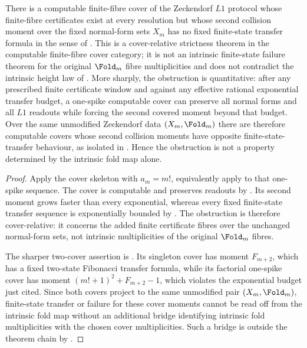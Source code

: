 \begin{theorem}
\label{thm:finite-state-strictness}
\label{thm:cover-relative-finite-fibre-certificates-do-not-force-finite-state-transfer}
There is a computable finite-fibre cover of the Zeckendorf \(L1\) protocol whose
finite-fibre certificates exist at every resolution but whose second collision
moment over the fixed normal-form sets \(X_m\) has no fixed finite-state transfer
formula in the sense of .  This is a
cover-relative strictness theorem in the computable
finite-fibre cover category; it is not an intrinsic finite-state failure theorem
for the original \(\Fold_m\) fibre multiplicities and does not contradict the
intrinsic height law of .  More sharply,
the obstruction is quantitative: after any prescribed finite certificate window
and against any effective rational exponential transfer budget, a one-spike computable
cover can preserve all normal forms and all \(L1\) readouts while forcing the
second covered moment beyond that budget.  Over the same unmodified Zeckendorf
data \((X_m,\Fold_m)\) there are therefore computable covers whose second
collision moments have opposite finite-state-transfer behaviour, as isolated in
.  Hence the
obstruction is not a property determined by the intrinsic fold map alone.
\end{theorem}

\begin{proof}
Apply the cover skeleton  with
\(a_m=m!\), equivalently apply  to
that one-spike sequence.  The cover is computable and preserves readouts by
.  Its second moment grows faster than every
exponential, whereas every fixed finite-state transfer sequence is exponentially
bounded by .  The obstruction is
therefore cover-relative: it concerns the added finite certificate fibres over
the unchanged normal-form sets, not intrinsic multiplicities of the original
\(\Fold_m\) fibres.

The sharper two-cover assertion is
.
Its singleton cover has moment \(F_{m+2}\), which has a fixed two-state Fibonacci
transfer formula, while its factorial one-spike cover has moment
\((m!+1)^2+F_{m+2}-1\), which violates the exponential budget just cited.  Since
both covers project to the same unmodified pair \((X_m,\Fold_m)\), finite-state
transfer or failure for these cover moments cannot be read off from the intrinsic
fold map without an additional bridge identifying intrinsic fold multiplicities
with the chosen cover multiplicities.  Such a bridge is outside the theorem chain
by .
\end{proof}

